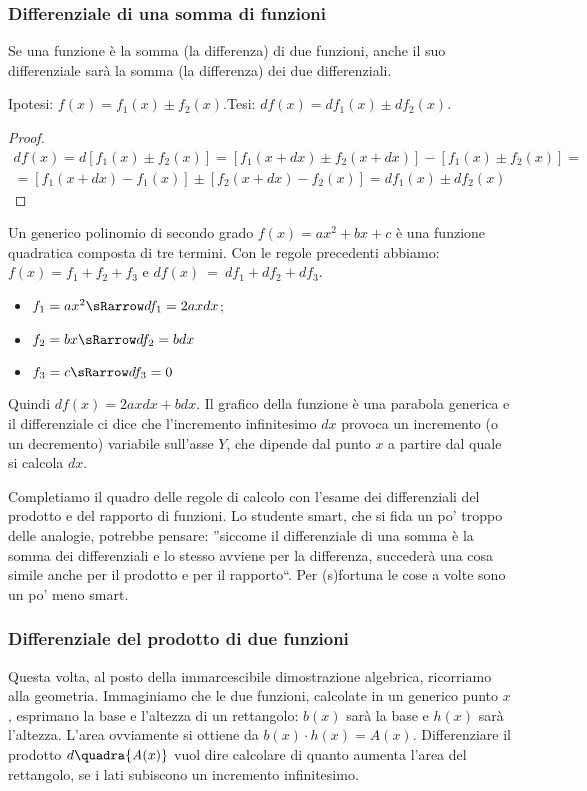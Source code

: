 \subsubsection{Differenziale di una somma di funzioni}
\label{}

\begin{teorema}
 Se una funzione è la somma (la differenza) di due funzioni, anche il suo 
 differenziale sarà la somma (la differenza) dei due differenziali.
\end{teorema}
\noindent Ipotesi: $f(x)=f_1(x)\pm f_2(x)$.\tab Tesi: $df(x)=df_1(x)\pm df_2(x)$.

\begin{proof}
\begin{align*}
 df(x)=d[f_1(x)\pm f_2(x)]=[f_1(x+dx)\pm f_2(x+dx)]-[f_1(x)\pm f_2(x)]=\\
 = [f_1(x+dx)-f_1(x)]\pm [f_2(x+dx)-f_2(x)]= df_1(x)\pm df_2(x)
\end{align*}
\end{proof}

\begin{esempio}
 Un generico polinomio di secondo grado \(f(x)=ax^2+bx+c\) è una
 funzione quadratica composta di tre termini. 
 Con le regole precedenti abbiamo: \(f(x)=f_1+f_2+f_3\) e
 \(df(x)~=~df_1+df_2+df_3\).
 \begin{itemize} [noitemsep]
  \item $f_1=ax^2 \sRarrow df_1=2axdx$; 
  \item $f_2=bx \sRarrow df_2=bdx$
  \item $f_3=c \sRarrow df_3=0$
 \end{itemize}
Quindi $df(x)=2axdx+bdx$. Il grafico della funzione è una parabola generica
e il differenziale ci dice che l'incremento infinitesimo 
$dx$ provoca un incremento (o un decremento) variabile sull'asse $Y$, che 
dipende dal punto $x$ a partire dal quale si calcola $dx$.
\end{esempio}

Completiamo il quadro delle regole di calcolo con l'esame dei differenziali
del prodotto e del rapporto di funzioni. Lo studente smart, che si fida un po' 
troppo delle analogie, potrebbe pensare: ''siccome il differenziale di una 
somma è la somma dei differenziali e lo stesso avviene per la differenza, 
succederà una cosa simile anche per il prodotto e per il rapporto``. 
Per (s)fortuna le cose a volte sono un po' meno smart.

\subsubsection{Differenziale del prodotto di due funzioni}
\label{}
Questa volta, al posto della immarcescibile dimostrazione algebrica, ricorriamo
alla geometria. Immaginiamo che le due funzioni, calcolate in un generico punto $x$,
esprimano la base e l'altezza di un rettangolo:
$b(x)$ sarà la base e $h(x)$ sarà l'altezza. L'area ovviamente
si ottiene da $b(x)\cdot h(x)=\mathit{A}(x)$. 
Differenziare il prodotto $d\quadra{\mathit{A}(x)}$ vuol dire calcolare di
quanto aumenta l'area del rettangolo, se i lati subiscono un incremento 
infinitesimo. 


